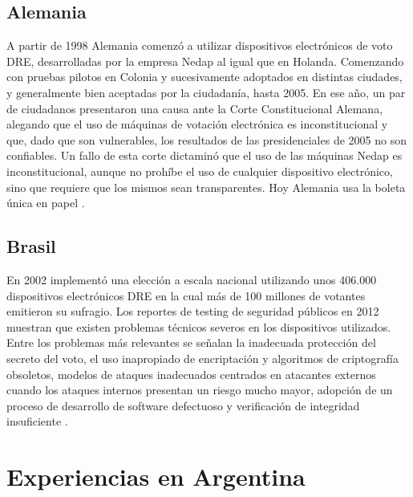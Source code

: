 
\subsection{Alemania}
A partir de 1998 Alemania comenzó a utilizar dispositivos electrónicos de voto DRE, desarrolladas por la empresa Nedap al igual que en Holanda. Comenzando con pruebas pilotos en Colonia y sucesivamente adoptados en distintas ciudades, y generalmente bien aceptadas por la ciudadanía, hasta 2005. En ese año, un par de ciudadanos presentaron una causa ante la Corte Constitucional Alemana, alegando que el uso de máquinas de votación electrónica es inconstitucional y que, dado que son vulnerables, los resultados de las presidenciales de 2005 no son confiables. Un fallo de esta corte dictaminó que el uso de las máquinas Nedap es inconstitucional, aunque no prohíbe el uso de cualquier dispositivo electrónico, sino que requiere que los mismos sean transparentes. Hoy Alemania usa la boleta única en papel \cite{volkamer2010electronic}.

\subsection{Brasil}
En 2002 implementó una elección a escala nacional utilizando unos 406.000 dispositivos electrónicos DRE en la cual más de 100 millones de votantes emitieron su sufragio. Los reportes de testing de seguridad públicos en 2012 muestran que existen problemas técnicos severos en los dispositivos utilizados. Entre los problemas más relevantes se señalan la inadecuada protección del secreto del voto, el uso inapropiado de encriptación y algoritmos de criptografía obsoletos, modelos de ataques inadecuados centrados en atacantes externos cuando los ataques internos presentan un riesgo mucho mayor, adopción de un proceso de desarrollo de software defectuoso y verificación de integridad insuficiente \cite{brunazo2005voto}.

\section{Experiencias en Argentina}

